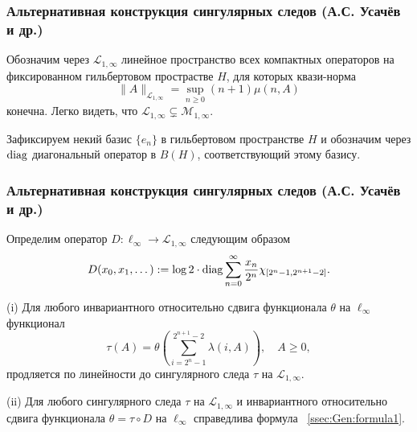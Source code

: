 \begin{frame}\frametitle{Альтернативная конструкция сингулярных следов (А.С. Усачёв и др.)}

	Обозначим через $\mathcal L_{1,\infty}$ линейное пространство всех компактных операторов на фиксированном гильбертовом прострастве $H$, для которых квази-норма
	$$\|A\|_{\mathcal L_{1,\infty}} = \sup_{n \ge 0} (n+1) \mu(n,A)$$
	конечна. Легко видеть, что $\mathcal L_{1,\infty} \subsetneq \mathcal M_{1,\infty}$.

	\vfill

	Зафиксируем некий базис $\{e_n\}$ в гильбертовом пространстве $H$ и обозначим через ${\rm diag}$ диагональный оператор в $B(H)$, соответствующий этому базису.

\end{frame}

\begin{frame}\frametitle{Альтернативная конструкция сингулярных следов (А.С. Усачёв и др.)}

	Определим оператор $D: \ell_\infty \to \mathcal L_{1,\infty}$ следующим образом
	\begin{align*}
	D(x_0, x_1, \dots) := \log 2 \cdot {\rm diag} \sum_{n=0}^\infty \frac{x_n}{2^n} \chi_{[2^n-1,2^{n+1}-2]}.
	\end{align*}

	\begin{ttheorem}
		(i) Для любого инвариантного относительно сдвига функционала $\theta$ на $\ell_\infty$ функционал
	\begin{equation}\label{ssec:Gen:formula1}
	\tau(A) = \theta\left(\sum_{i=2^n-1}^{2^{n+1}-2} \lambda(i,A) \right) , \quad A\ge0,
	\end{equation}
	продляется по линейности до сингулярного следа $\tau$ на $\mathcal L_{1,\infty}$.

	(ii) Для любого сингулярного следа $\tau$ на $\mathcal L_{1,\infty}$ и инвариантного относительно сдвига функционала $\theta=\tau\circ D$ на $\ell_\infty$ справедлива формула ~\eqref{ssec:Gen:formula1}.
	\end{ttheorem}

\end{frame}



